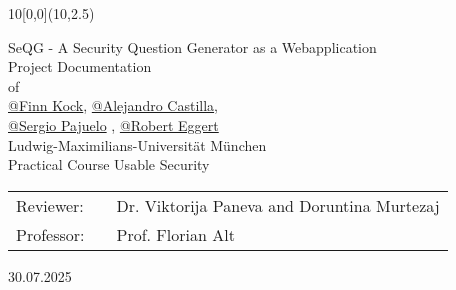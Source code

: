 \documentclass{thesisclass}
\makeatletter
\newcommand{\type}{Project Documentation}
\newcommand{\group}{\href{https://github.com/finnkock}{@Finn Kock}, \href{https://github.com/alecasbar}{@Alejandro Castilla}, \\
					\href{https://github.com/sergioPajuelo}{@Sergio Pajuelo} , \href{https://github.com/RobertEggert}{@Robert Eggert}}
\newcommand{\mytitle}{SeQG - A Security Question Generator as a Webapplication}
\newcommand{\course}{Practical Course Usable Security}
\newcommand{\reviewerone}{Dr. Viktorija Paneva and Doruntina Murtezaj}
\newcommand{\prof}{Prof. Florian Alt}
\newcommand{\timeend}{30.07.2025}
\makeatother
\begin{document}
\begin{titlepage}
	\begin{textblock}{10}[0,0](10,2.5)
	\end{textblock}
	\vspace*{3cm}
	\begin{center}
		\Huge{\mytitle}
		\vspace*{1.6cm}\\ %
		\Large{
			\type\\of
		}\\
		\vspace*{1cm}
		\huge{\group}\\
		\vspace*{1cm} %
		\Large{
			{Ludwig-Maximilians-Universität München}
			\\
			\course
		}
	\end{center}
	\vspace*{1.8cm} %
	\Large{
		\begin{center}
			\begin{tabular}[ht]{l c l}

				Reviewer: & \hfill  & \reviewerone\\
                Professor: & \hfill & \prof
			
			\end{tabular}
		\end{center}
	}
	
	
	\vspace{1.8cm} %
	\begin{center}
		\timeend
	\end{center}
	
	
	
\end{titlepage}
\clearpage





\end{document}
